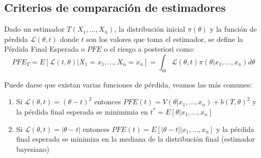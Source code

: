 \subsection{Criterios de comparación de estimadores}

\begin{definición}
  Dado un estimador $T(X_1, \ldots, X_n)$, la distribución inicial $\pi(\theta)$ y la función de pérdida $\mathcal{L}(\theta, t)$ donde $t$ son los valores que toma el estimador, se define la Pérdida Final Esperada o $PFE$ o el riesgo a posteriori como: 
  $$PFE_T = E[\mathcal{L}(t, \theta) | X_1 = x_1, \ldots, X_n = x_n] = \int_{\Theta} \mathcal{L}(\theta, t)\pi(\theta | x_1, \ldots, x_n)d\theta$$
\end{definición}

\begin{proposición}
  Puede darse que existan varias funciones de pérdida, veamos las más comunes: 
  \begin{enumerate}
    \item Si $\mathcal{L}(\theta, t) = (\theta - t)^2$ entonces $PFE(t) = V(\theta | x_1, \ldots, x_n) + b(T, \theta)^2$ y la pérdida final esperada se minimimia en $t^* = E[\theta | x_1, \ldots, x_n]$
    \item Si $\mathcal{L}(\theta, t) = |\theta - t|$ entonces $PFE(t) = E[|\theta - t| | x_1, \ldots, x_n]$ y la pérdida final esperada se minimiza en la mediana de la distribución final (estimador bayesiano)
  \end{enumerate}
\end{proposición}

